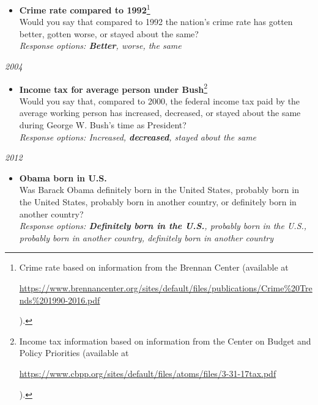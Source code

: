 \documentclass[12pt, letterpaper]{article}
\begin{document}
\normalsize
\begin{itemize}
\item \textbf{Crime rate compared to 1992}\footnote{Crime rate based on information from the Brennan Center (available at \begin{footnotesize}\url{https://www.brennancenter.org/sites/default/files/publications/Crime\%20Trends\%201990-2016.pdf}\end{footnotesize}).} \\
Would you say that compared to 1992 the nation's crime rate has gotten better, gotten worse, or stayed about the same?        \\     
\textit{Response options: \textbf{Better}, worse, the same} \\
\end{itemize}

\large \noindent\textit{2004}

\normalsize
\begin{itemize}
\item \textbf{Income tax for average person under Bush}\footnote{Income tax information based on information from the Center on Budget and Policy Priorities (available at \begin{footnotesize}\url{https://www.cbpp.org/sites/default/files/atoms/files/3-31-17tax.pdf}\end{footnotesize}).} \\
Would you say that, compared to 2000, the federal income tax paid by the average working person has increased, decreased, or stayed about the same during George W. Bush's time as President?        \\     
\textit{Response options: Increased, \textbf{decreased}, stayed about the same} \\
\end{itemize}


\large \noindent\textit{2012}

\normalsize
\begin{itemize}
\item \textbf{Obama born in U.S.} \\
Was Barack Obama definitely born in the United States, probably born in the United States, probably born in another country, or definitely born in another country?  \\     
\textit{Response options: \textbf{Definitely born in the U.S.}, probably born in the U.S., probably born in another country, definitely born in another country} \\
\end{itemize}
\end{document}
